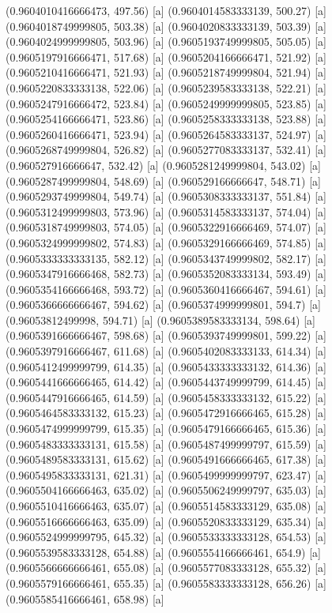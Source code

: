 {{{(0.9604010416666473, 497.56) [a] 
(0.9604014583333139, 500.27) [a] 
(0.9604018749999805, 503.38) [a] 
(0.9604020833333139, 503.39) [a] 
(0.9604024999999805, 503.96) [a] 
(0.9605193749999805, 505.05) [a] 
(0.9605197916666471, 517.68) [a] 
(0.9605204166666471, 521.92) [a] 
(0.9605210416666471, 521.93) [a] 
(0.9605218749999804, 521.94) [a] 
(0.9605220833333138, 522.06) [a] 
(0.9605239583333138, 522.21) [a] 
(0.9605247916666472, 523.84) [a] 
(0.9605249999999805, 523.85) [a] 
(0.9605254166666471, 523.86) [a] 
(0.9605258333333138, 523.88) [a] 
(0.9605260416666471, 523.94) [a] 
(0.9605264583333137, 524.97) [a] 
(0.9605268749999804, 526.82) [a] 
(0.9605277083333137, 532.41) [a] 
(0.960527916666647, 532.42) [a] 
(0.9605281249999804, 543.02) [a] 
(0.9605287499999804, 548.69) [a] 
(0.960529166666647, 548.71) [a] 
(0.9605293749999804, 549.74) [a] 
(0.9605308333333137, 551.84) [a] 
(0.9605312499999803, 573.96) [a] 
(0.9605314583333137, 574.04) [a] 
(0.9605318749999803, 574.05) [a] 
(0.9605322916666469, 574.07) [a] 
(0.9605324999999802, 574.83) [a] 
(0.9605329166666469, 574.85) [a] 
(0.9605333333333135, 582.12) [a] 
(0.9605343749999802, 582.17) [a] 
(0.9605347916666468, 582.73) [a] 
(0.9605352083333134, 593.49) [a] 
(0.9605354166666468, 593.72) [a] 
(0.9605360416666467, 594.61) [a] 
(0.9605366666666467, 594.62) [a] 
(0.9605374999999801, 594.7) [a] 
(0.96053812499998, 594.71) [a] 
(0.9605389583333134, 598.64) [a] 
(0.9605391666666467, 598.68) [a] 
(0.9605393749999801, 599.22) [a] 
(0.9605397916666467, 611.68) [a] 
(0.9605402083333133, 614.34) [a] 
(0.9605412499999799, 614.35) [a] 
(0.9605433333333132, 614.36) [a] 
(0.9605441666666465, 614.42) [a] 
(0.9605443749999799, 614.45) [a] 
(0.9605447916666465, 614.59) [a] 
(0.9605458333333132, 615.22) [a] 
(0.9605464583333132, 615.23) [a] 
(0.9605472916666465, 615.28) [a] 
(0.9605474999999799, 615.35) [a] 
(0.9605479166666465, 615.36) [a] 
(0.9605483333333131, 615.58) [a] 
(0.9605487499999797, 615.59) [a] 
(0.9605489583333131, 615.62) [a] 
(0.9605491666666465, 617.38) [a] 
(0.9605495833333131, 621.31) [a] 
(0.9605499999999797, 623.47) [a] 
(0.9605504166666463, 635.02) [a] 
(0.9605506249999797, 635.03) [a] 
(0.9605510416666463, 635.07) [a] 
(0.9605514583333129, 635.08) [a] 
(0.9605516666666463, 635.09) [a] 
(0.9605520833333129, 635.34) [a] 
(0.9605524999999795, 645.32) [a] 
(0.9605533333333128, 654.53) [a] 
(0.9605539583333128, 654.88) [a] 
(0.9605554166666461, 654.9) [a] 
(0.9605566666666461, 655.08) [a] 
(0.9605577083333128, 655.32) [a] 
(0.9605579166666461, 655.35) [a] 
(0.9605583333333128, 656.26) [a] 
(0.9605585416666461, 658.98) [a] 
}}}
